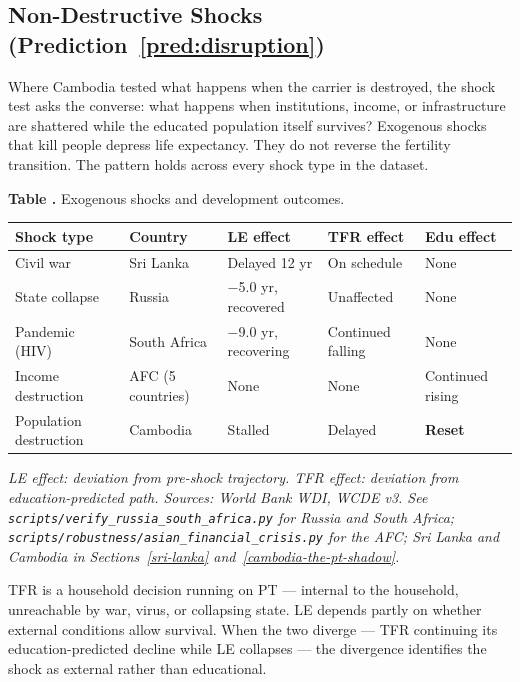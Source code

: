 \documentclass[12pt,letterpaper]{article}
\begin{document}
\subsection{Non-Destructive Shocks (Prediction~\ref{pred:disruption})}\label{the-shock-test}

Where Cambodia tested what happens when the carrier is destroyed,
the shock test asks the converse: what happens when institutions,
income, or infrastructure are shattered while the educated population
itself survives? Exogenous shocks that kill people depress life
expectancy. They do not reverse the fertility transition. The pattern holds across every shock type in the dataset.

\label{tab:shock}\textbf{Table \thetable.} Exogenous shocks and development outcomes.

{\small
\begin{longtable}[]{@{}
  >{\raggedright\arraybackslash}p{}
  >{\raggedright\arraybackslash}p{}
  >{\raggedright\arraybackslash}p{}
  >{\raggedright\arraybackslash}p{}
  >{\raggedright\arraybackslash}p{}@{}}
\toprule
Shock type & Country & LE effect & TFR effect & Edu effect \\
\midrule
\endhead
Civil war & Sri Lanka & Delayed 12 yr & On schedule & None \\
State collapse & Russia & $-$5.0 yr, recovered & Unaffected & None \\
Pandemic (HIV) & South Africa & $-$9.0 yr, recovering & Continued falling & None \\
Income destruction & AFC (5 countries) & None & None & Continued rising \\
Population destruction & Cambodia & Stalled & Delayed & \textbf{Reset} \\
\bottomrule
\end{longtable}
}

\emph{LE effect: deviation from pre-shock trajectory. TFR effect:
deviation from education-predicted path. Sources: World Bank WDI, WCDE
v3. See \texttt{scripts/verify\_russia\_south\_africa.py} for Russia and
South Africa; \texttt{scripts/robustness/asian\_financial\_crisis.py} for the AFC;
Sri Lanka and Cambodia in Sections~\ref{sri-lanka}
and~\ref{cambodia-the-pt-shadow}.}

TFR is a household decision running on PT --- internal to the household,
unreachable by war, virus, or collapsing state. LE depends partly on
whether external conditions allow survival. When the two diverge --- TFR
continuing its education-predicted decline while LE collapses --- the
divergence identifies the shock as external rather than educational.
\end{document}
